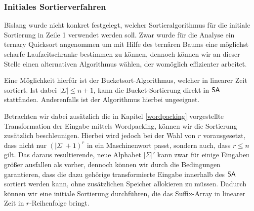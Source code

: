\subsubsection{Initiales Sortierverfahren}
Bislang wurde nicht konkret festgelegt, welcher Sortieralgorithmus für die initiale Sortierung in Zeile 1 verwendet werden soll. Zwar wurde für die Analyse ein ternary Quicksort angenommen um mit Hilfe des ternären Baums eine möglichst scharfe Laufzeitschranke bestimmen zu können, dennoch können wir an dieser Stelle einen alternativen Algorithmus wählen, der womöglich effizienter arbeitet.

Eine Möglichkeit hierfür ist der Bucketsort-Algorithmus, welcher in linearer Zeit sortiert. Ist dabei $|\Sigma| \leq n+1$, kann die Bucket-Sortierung direkt in $\sa$ stattfinden. Anderenfalls ist der Algorithmus hierbei ungeeignet.

Betrachten wir dabei zusätzlich die in Kapitel \ref{wordpacking} vorgestellte Transformation der Eingabe mittels Wordpacking, können wir die Sortierung zusätzlich beschleunigen. Hierbei wird jedoch bei der Wahl von $r$ vorausgesetzt, dass nicht nur $(|\Sigma| + 1)^r$ in ein Maschinenwort passt, sondern auch, dass $r \leq  n$ gilt. Das daraus resultierende, neue Alphabet $|\Sigma|'$ kann zwar für einige Eingaben größer ausfallen als vorher, dennoch können wir durch die Bedingungen garantieren, dass die dazu gehörige transformierte Eingabe innerhalb des $\sa$ sortiert werden kann, ohne zusätzlichen Speicher allokieren zu müssen. Dadurch können wir eine initiale Sortierung durchführen, die das Suffix-Array in linearer Zeit in $r$-Reihenfolge bringt.